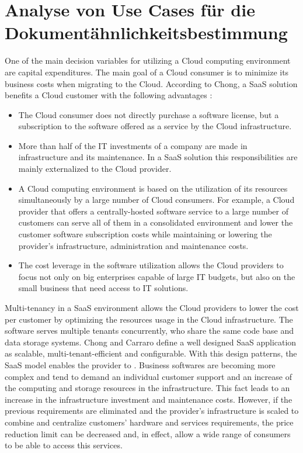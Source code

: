 \section{Analyse von Use Cases für die Dokumentähnlichkeitsbestimmung}
\label{sec:AnalyseUse}   

One of the main decision variables for utilizing a Cloud computing environment are capital expenditures. The main goal of a Cloud consumer is to minimize its business costs when migrating to the Cloud. According to Chong, a \ac{SaaS} solution benefits a Cloud customer with the following advantages \cite{ChongB2006}:

	\begin{itemize}
		\item The Cloud consumer does not directly purchase a software license, but a subscription to the software offered as a service by the Cloud infrastructure. 
		\item More than half of the IT investments of a company are made in infrastructure and its maintenance. In a \ac{SaaS} solution this responsibilities are mainly externalized to the Cloud provider.   
		\item A Cloud computing environment is based on the utilization of its resources simultaneously by a large number of Cloud consumers. For example, a Cloud provider that offers a centrally-hosted software service to a large number of customers can serve all of them in a consolidated environment and lower the customer software subscription costs while maintaining or lowering the provider's infrastructure, administration and maintenance costs. 
		\item The cost leverage in the software utilization allows the Cloud providers to focus not only on big enterprises capable of large IT budgets, but also on the small business that need access to IT solutions. 
	\end{itemize} 

Multi-tenancy in a \ac{SaaS} environment allows the Cloud providers to lower the cost per customer by optimizing the resources usage in the Cloud infrastructure. The software serves multiple tenants concurrently, who share the same code base and data storage systems. Chong and Carraro \cite{ChongB2006} define a well designed \ac{SaaS} application as scalable, multi-tenant-efficient and configurable. With this design patterns, the \ac{SaaS} model enables the provider to . Business softwares are becoming more complex and tend to demand an individual customer support and an increase of the computing and storage resources in the infrastructure. This fact leads to an increase in the infrastructure investment and maintenance costs. However, if the previous requirements are eliminated and the provider's infrastructure is scaled to combine and centralize customers' hardware and services requirements, the price reduction limit can be decreased and, in effect, allow a wide range of consumers to be able to access this services.

